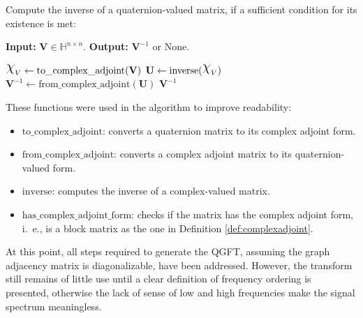 \newcommand{\algorithmspacing}{0.5}
\begin{algorithm}
    \label{alg:qinv}
    Compute the inverse of a quaternion-valued matrix, if a sufficient condition for its existence is met:
    \vspace*{-\algorithmspacing\baselineskip}
    \begin{leftbar}
        \noindent\textbf{\upshape Input:} $\mathbf{V} \in \mathbb{H}^{n \times n}$. \textbf{\upshape Output:} $\mathbf{V}^{-1}$ or {\upshape None}.

        \begin{algorithmic}[1]
            \State $\rchi_V \gets \mathrm{to\_complex\_adjoint}(\mathbf{V})$
            \State {}
            \Else
            \State $\mathbf{U} \gets \mathrm{inverse}(\rchi_V)$
            \State {}
            \Else
            \State $\mathbf{V}^{-1} \gets \mathrm{from\_complex\_adjoint}(\mathbf{U})$
            \State \Return $\mathbf{V}^{-1}$
            \EndIf
            \EndIf
        \end{algorithmic}
    \end{leftbar}
    \vspace*{-\algorithmspacing\baselineskip}
    \noindent These functions were used in the algorithm to improve readability:
    \vspace*{-\algorithmspacing\baselineskip}
    \begin{itemize}[noitemsep]
        \item $\mathrm{to\_complex\_adjoint}$: converts a quaternion matrix to its complex adjoint form.
        \item $\mathrm{from\_complex\_adjoint}$: converts a complex adjoint matrix to its quaternion-valued form.
        \item $\mathrm{inverse}$: computes the inverse of a complex-valued matrix.
        \item $\mathrm{has\_complex\_adjoint\_form}$: checks if the matrix has the complex adjoint form, i.~e., is a block matrix as the one in Definition \ref{def:complexadjoint}.
    \end{itemize}
\end{algorithm}

At this point, all steps required to generate the QGFT, assuming the graph adjacency matrix is diagonalizable, have been addressed. However, the transform still remains of little use until a clear definition of frequency ordering is presented, otherwise the lack of sense of low and high frequencies make the signal spectrum meaningless.

